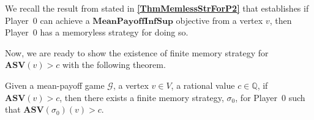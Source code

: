 We recall the result from \cite{VCDHRR15} stated in \textbf{\cref{ThmMemlessStrForP2}} that establishes if Player~0 can achieve a $\mathbf{MeanPayoffInfSup}$ objective from a vertex $v$, then Player~0 has a memoryless strategy for doing so.


Now, we are ready to show the existence of finite memory strategy for $\mathbf{ASV}(v) > c$ with the following theorem.

\begin{lemma}
\label{LemFinMemWitnessASVNonEps}
Given a mean-payoff game $\mathcal{G}$, a vertex $v \in V$, a rational value $c \in \mathbb{Q}$, if $\mathbf{ASV}(v) > c$, then there exists a finite memory strategy, $\sigma_0$, for Player~0 such that $\mathbf{ASV}(\sigma_0)(v) > c$.
\end{lemma}

